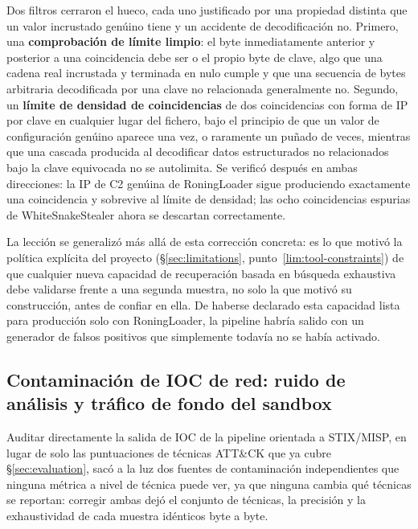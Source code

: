 Dos filtros cerraron el hueco, cada uno justificado por una propiedad
distinta que un valor incrustado gen\'uino tiene y un accidente de
decodificaci\'on no. Primero, una \textbf{comprobaci\'on de l\'imite
limpio}: el byte inmediatamente anterior y posterior a una coincidencia
debe ser  o el propio byte de clave, algo que una cadena
real incrustada y terminada en nulo cumple y que una secuencia de
bytes arbitraria decodificada por una clave no relacionada
generalmente no. Segundo, un \textbf{l\'imite de densidad de
coincidencias} de dos coincidencias con forma de IP por clave en
cualquier lugar del fichero, bajo el principio de que un valor de
configuraci\'on gen\'uino aparece una vez, o raramente un pu\~nado de
veces, mientras que una cascada producida al decodificar datos
estructurados no relacionados bajo la clave equivocada no se
autolimita. Se verific\'o despu\'es en ambas direcciones: la IP de C2
gen\'uina de RoningLoader sigue produciendo exactamente una coincidencia
y sobrevive al l\'imite de densidad; las ocho coincidencias espurias de
WhiteSnakeStealer ahora se descartan correctamente.

La lecci\'on se generaliz\'o m\'as all\'a de esta correcci\'on
concreta: es lo que motiv\'o la pol\'itica expl\'icita del proyecto
(\S\ref{sec:limitations}, punto~\ref{lim:tool-constraints}) de que cualquier nueva capacidad de
recuperaci\'on basada en b\'usqueda exhaustiva debe validarse frente a
una segunda muestra, no solo la que motiv\'o su construcci\'on, antes
de confiar en ella. De haberse declarado esta capacidad lista para
producci\'on solo con RoningLoader, la pipeline habr\'ia salido con un
generador de falsos positivos que simplemente todav\'ia no se hab\'ia
activado.

\subsection{Contaminaci\'on de IOC de red: ruido de an\'alisis y
  tr\'afico de fondo del sandbox}
\label{sec:case-ioc-noise}

Auditar directamente la salida de IOC de la pipeline orientada a
STIX/MISP, en lugar de solo las puntuaciones de t\'ecnicas ATT\&CK que
ya cubre \S\ref{sec:evaluation}, sac\'o a la luz dos fuentes de
contaminaci\'on independientes que ninguna m\'etrica a nivel de
t\'ecnica puede ver, ya que ninguna cambia qu\'e t\'ecnicas se
reportan: corregir ambas dej\'o el conjunto de t\'ecnicas, la
precisi\'on y la exhaustividad de cada muestra id\'enticos byte a
byte.

